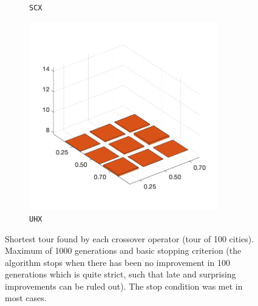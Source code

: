 \begin{figure}[H]
\begin{subfigure}[b]{0.25\textwidth}
		\caption{\texttt{SCX}}
		\label{fig:y}
    	\end{subfigure}
%
	\begin{subfigure}[b]{0.25\textwidth}
		\centering
		\includegraphics[width=0.9\textwidth]{crossover/min/cross_unnamed_2.png}
		\caption{\texttt{UHX}}
		\label{fig:z}
    	\end{subfigure}
	\caption{Shortest tour found by each crossover operator (tour of 100 cities). Maximum of 1000 generations and basic stopping criterion (the algorithm stops when there has been no improvement in 100 generations which is quite strict, such that late and surprising improvements can be ruled out). The stop condition was met in most cases.}
	\label{fig:rescross2}
\end{figure}


